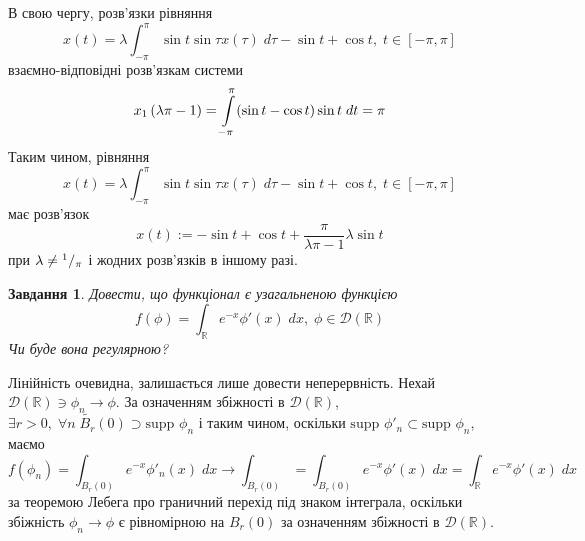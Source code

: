 \documentclass[12pt]{article} %
\newtheorem{prob}{Завдання}
\newcommand{\dt}{\;dt}
\newcommand{\dx}{\;dx}
\begin{document}
	В свою чергу, розв’язки рівняння
	\[x(t)=\lambda\int_{-\pi}^{\pi}\sin t\sin\tau x(\tau)\;d\tau-\sin t+\cos t,\;t\in[-\pi,\pi]\]
	взаємно-відповідні розв’язкам системи
	\[x_1\mybra{{\lambda}{\pi}-1}=\int_{-\pi}^\pi(\sin t-\cos t)\sin t\dt=\pi\]
	Таким чином, рівняння
	\[x(t)=\lambda\int_{-\pi}^{\pi}\sin t\sin\tau x(\tau)\;d\tau-\sin t+\cos t,\;t\in[-\pi,\pi]\]
	має розв’язок \[x(t):=-\sin t+\cos t+\frac{\pi}{\lambda\pi-1}\lambda\sin t\]
	при $\lambda\neq{^{1}/_{\pi}}$ і жодних розв’язків в іншому разі.
\begin{prob}
	Довести, що функціонал є узагальненою функцією	\[f(\phi)=\int_{\mathbb{R}}e^{-x}\phi'(x)\dx,\;\phi\in\mathcal{D}(\mathbb{R})\]
	Чи буде вона регулярною?
\end{prob}
\newcommand{\supp}{\mbox{supp }}
Лінійність очевидна, залишається лише довести неперервність. Нехай $\mathcal{D}(\mathbb{R})\ni\phi_n\to\phi$. За означенням
збіжності в $\mathcal{D}(\mathbb{R})$, $\exists r>0,\;
\forall n\;\widetilde{B_r}(0)\supset\supp\phi_n$ і таким чином, оскільки $\supp\phi'_n\subset\supp\phi_n$, маємо
\[f(\phi_n)=\int_{B_r(0)}e^{-x}\phi'_n(x)\dx\to\int_{B_r(0)}=\int_{B_r(0)}e^{-x}\phi'(x)\dx=\int_{\mathbb{R}}e^{-x}\phi'(x)\dx\]
за теоремою Лебега про граничний перехід під знаком інтеграла,
оскільки збіжність $\phi_n\to\phi$ є рівномірною на $B_r(0)$ за означенням збіжності в $\mathcal{D}(\mathbb{R})$.
\end{document}

